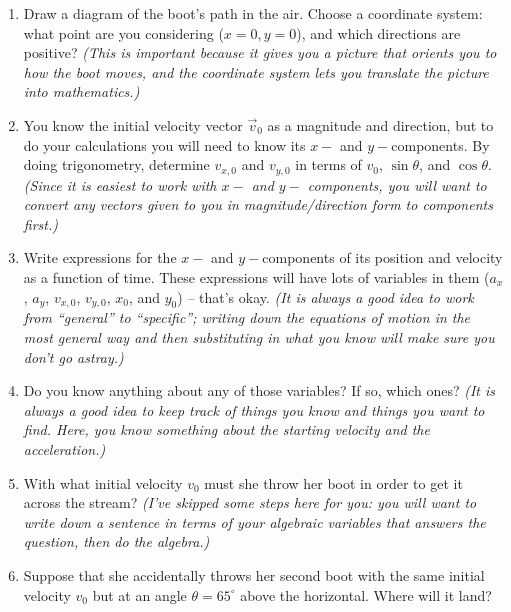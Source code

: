 \documentclass[12pt]{article}
\begin{document}
\begin{enumerate}

\item Draw a diagram of the boot's path in the air. Choose a coordinate system: what point are you considering ($x=0, y=0$), and which directions are positive? {\it (This is important because it gives you a picture that orients you to how the boot moves, and the coordinate system lets you translate the picture into mathematics.)}

\vspace{2in}
\item You know the initial velocity vector $\vec v_0$ as a magnitude and direction, but to do your calculations you will need to know its $x-$ and $y-$components. By doing trigonometry,
determine $v_{x,0}$ and $v_{y,0}$ in terms of $v_0$, $\sin \theta$, and $\cos \theta$. {\it (Since it is easiest to work with $x-$ and $y-$ components, you will want to convert any vectors given to you in magnitude/direction form to components first.)}

\vspace{2in}

\item Write expressions for the $x-$ and $y-$components of its position and velocity as a function of time. These expressions will have lots of variables in them ($a_x$, $a_y$, $v_{x,0}$, $v_{y,0}$, $x_0$, and $y_0$) -- that's okay. {\it (It is always a good idea to work from ``general'' to ``specific''; writing down the equations of motion in the most general way and then substituting in what you know will make sure you don't go astray.)}

\vspace{2in}
\newpage

\item Do you know anything about any of those variables? If so, which ones? {\it (It is always a good idea to keep track of things you know and things you want to find. Here, you know something about the starting velocity and the acceleration.)}

\vspace{1in}

\item With what initial velocity $v_0$ must she throw her boot in order to get it across the stream? {\it (I've skipped some steps here for you: you will want to write down a sentence in terms of your algebraic variables that answers the question, then do the algebra.)}

\vspace{3in}

\item Suppose that she accidentally throws her second boot with the same initial velocity $v_0$ but at an angle $\theta = 65^\circ$ above the horizontal. Where will it land?

\vspace{2in}

\end{enumerate}
\end{document}
